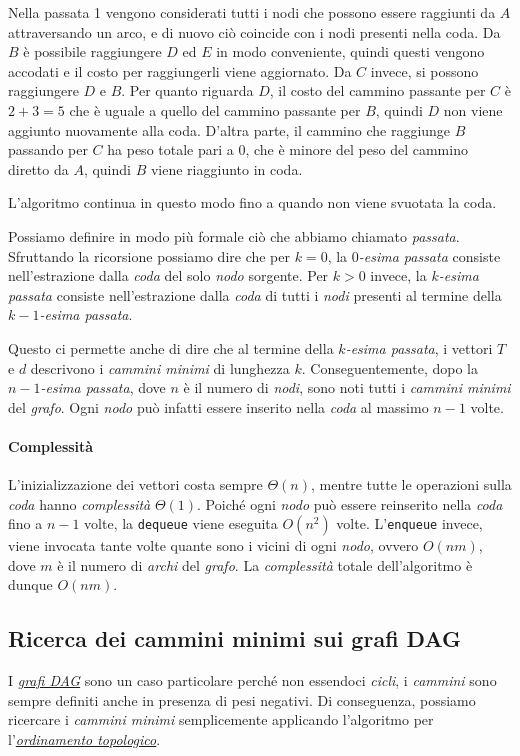 \begin{eg}
Nella passata 1 vengono considerati tutti i nodi che possono essere raggiunti da
$A$ attraversando un arco, e di nuovo ciò coincide con i nodi presenti nella coda.
Da $B$ è possibile raggiungere $D$ ed $E$ in modo conveniente, quindi questi
vengono accodati e il costo per raggiungerli viene aggiornato. Da $C$ invece, si
possono raggiungere $D$ e $B$. Per quanto riguarda $D$, il costo del cammino
passante per $C$ è $2+3=5$ che è uguale a quello del cammino passante per $B$,
quindi $D$ non viene aggiunto nuovamente alla coda. D'altra parte, il cammino
che raggiunge $B$ passando per $C$ ha peso totale pari a 0, che è minore del
peso del cammino diretto da $A$, quindi $B$ viene riaggiunto in coda.

L'algoritmo continua in questo modo fino a quando non viene svuotata la coda.
\end{eg}

\noindent
Possiamo definire in modo più formale ciò che abbiamo chiamato \emph{passata}.
Sfruttando la ricorsione possiamo dire che per $k=0$, la \emph{$0$-esima passata}
consiste nell'estrazione dalla \emph{coda} del solo \emph{nodo} sorgente.
Per $k>0$ invece, la \emph{$k$-esima passata} consiste nell'estrazione dalla
\emph{coda} di tutti i \emph{nodi} presenti al termine della \emph{$k-1$-esima
passata}.

Questo ci permette anche di dire che al termine della \emph{$k$-esima passata},
i vettori $T$ e $d$ descrivono i \emph{cammini minimi} di lunghezza $k$.
Conseguentemente, dopo la \emph{$n-1$-esima passata}, dove $n$ è il
numero di \emph{nodi}, sono noti tutti i \emph{cammini minimi} del \emph{grafo}.
Ogni \emph{nodo} può infatti essere inserito nella \emph{coda} al massimo $n-1$
volte.

\paragraph{Complessità}
L'inizializzazione dei vettori costa sempre $\Theta(n)$, mentre tutte le
operazioni sulla \emph{coda} hanno \emph{complessità} $\Theta(1)$. Poiché ogni
\emph{nodo} può essere reinserito nella \emph{coda} fino a $n-1$ volte, la
\texttt{dequeue} viene eseguita $O(n^2)$ volte. L'\texttt{enqueue} invece,
viene invocata tante volte quante sono i vicini di ogni \emph{nodo}, ovvero
$O(nm)$, dove $m$ è il numero di \emph{archi} del \emph{grafo}. La
\emph{complessità} totale dell'algoritmo è dunque $O(nm)$.

\subsection{Ricerca dei cammini minimi sui grafi DAG}
I \emph{\hyperref[def:79]{grafi DAG}} sono un caso particolare perché non
essendoci \emph{cicli}, i \emph{cammini} sono sempre definiti anche in presenza
di pesi negativi. Di conseguenza, possiamo ricercare i \emph{cammini minimi}
semplicemente applicando l'algoritmo per l'\emph{\hyperref[def:83]{ordinamento
topologico}}.

